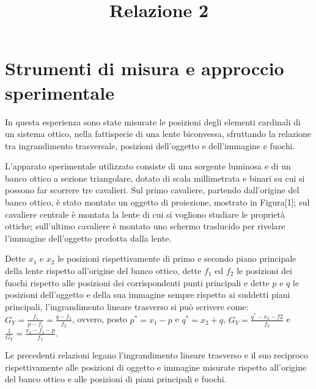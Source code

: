 \documentclass{article}
\title{Relazione 2}
\begin{document}
	
	\maketitle
	
	
	
	\section{Strumenti di misura e approccio sperimentale}
	
	In questa esperienza sono state misurate le posizioni degli elementi cardinali di un sistema ottico, nella fattispecie di una lente biconvessa, sfruttando la relazione tra ingrandimento trasversale, posizioni dell'oggetto e dell'immagine e fuochi.
	
	L'apparato sperimentale utilizzato consiste di una sorgente luminosa e di un banco ottico a sezione triangolare, dotato di scala millimetrata e binari su cui si possono far scorrere tre cavalieri. Sul primo cavaliere, partendo dall'origine del banco ottico, è stato montato un oggetto di proiezione, mostrato in Figura[1]; sul cavaliere centrale è montata la lente di cui si vogliono studiare le proprietà ottiche; sull'ultimo cavaliere è montato uno schermo traslucido per rivelare l'immagine dell'oggetto prodotta dalla lente.
	
	Dette $x_1$ e $x_2$ le posizioni rispettivamente di primo e secondo piano principale della lente rispetto all'origine del banco ottico, dette $f_1$ ed $f_2$ le posizioni dei fuochi rispetto alle posizioni dei corrispondenti punti principali e dette $p$ e $q$ le posizioni dell'oggetto e della sua immagine sempre rispetto ai suddetti piani principali, l'ingrandimento lineare trasverso si può scrivere come: 
	$G_Y=\frac{f_1}{p-f_1}=\frac{q-f_2}{f_2}$,
	ovvero, posto $p^*=x_1-p$ e $q^*=x_2+q$,
	$G_Y=\frac{q^*-x_2-f2}{f_2}$
	e
	$\frac{1}{G_Y}=\frac{x_1-f_1-p}{f_1}$.
	
	Le precedenti relazioni legano l'ingrandimento lineare trasverso e il suo reciproco rispettivamente alle posizioni di oggetto e immagine misurate rispetto all'origine del banco ottico e alle posizioni di piani principali e fuochi.
	
\end{document}
